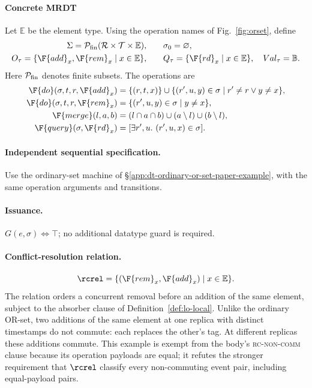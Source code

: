 \paragraph{Concrete MRDT}
Let $\mathbb E$ be the element type. Using the operation names of
Fig.~\ref{fig:orset}, define
\[
\begin{aligned}
\Sigma=\mathcal P_{\rm fin}(\mathcal R\times\mathcal T\times\mathbb E),\qquad &\sigma_0=\varnothing,\\
O_\tau=\{\F{add}_x,\F{rem}_x\mid x\in\mathbb E\},\qquad
&Q_\tau=\{\F{rd}_x\mid x\in\mathbb E\},\quad Val_\tau=\mathbb B.
\end{aligned}
\]
Here $\mathcal P_{\rm fin}$ denotes finite subsets. The operations are
\[
\begin{aligned}
\F{do}(\sigma,t,r,\F{add}_x)&=\{(r,t,x)\}\cup\{(r',u,y)\in\sigma\mid r'\ne r\lor y\ne x\},\\
\F{do}(\sigma,t,r,\F{rem}_x)&=\{(r',u,y)\in\sigma\mid y\ne x\},\\
\F{merge}(l,a,b)&=(l\cap a\cap b)\cup(a\setminus l)\cup(b\setminus l),\\
\F{query}(\sigma,\F{rd}_x)&=[\exists r',u.\ (r',u,x)\in\sigma].
\end{aligned}
\]

\paragraph{Independent sequential specification.}
Use the ordinary-set machine of
\S\ref{app:dt-ordinary-or-set-paper-example}, with the same operation
arguments and transitions.

\paragraph{Issuance.}
$G(e,\sigma)\iff\top$; no additional datatype guard is required.

\paragraph{Conflict-resolution relation.}
\[
\rcrel=\{(\F{rem}_x,\F{add}_x)\mid x\in\mathbb E\}.
\]
The relation orders a concurrent removal before an addition of the same
element, subject to the absorber clause of Definition~\ref{def:lo-local}.
Unlike the ordinary OR-set, two additions of the same element at one replica
with distinct timestamps do not commute: each replaces the other's tag.
At different replicas these additions commute. This example is exempt from
the body's \textsc{rc-non-comm} clause because its operation payloads are
equal; it refutes the stronger requirement that $\rcrel$ classify every
non-commuting event pair, including equal-payload pairs.

